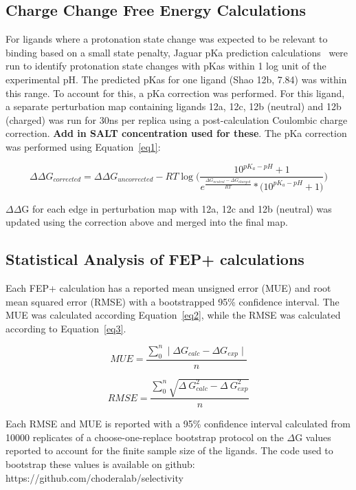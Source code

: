 \documentclass[phd,tocprelim]{cornell}
\begin{document}
\subsection{Charge Change Free Energy Calculations} 
For ligands where a protonation state change was expected to be relevant to binding based on a small state penalty, Jaguar pKa prediction calculations~\citep{Bochevarov2013-bn} were run to identify protonation state changes with pKas within 1 log unit of the experimental pH. The predicted pKas for one ligand (Shao 12b, 7.84) was within this range. To account for this, a pKa correction was performed. For this ligand, a separate perturbation map containing ligands 12a, 12c, 12b (neutral) and 12b (charged) was run for 30ns per replica using a post-calculation Coulombic charge correction. \textbf{Add in SALT concentration used for these}. The pKa correction was performed using Equation~\ref{eq1}: 

\begin{equation}\label{eq1}
\Delta\Delta G_{corrected} = \Delta\Delta G_{uncorrected} - RT\log\Bigg(\frac{10^{pK_a -pH}+1}{e^{\frac{\Delta G_{neutral} - \Delta G_{charged}}{RT}} * \big(10^{pK_a - pH}+1\big)}\Bigg)
\end{equation}

$\Delta\Delta$G for each edge in perturbation map with 12a, 12c and 12b (neutral) was updated using the correction above and merged into the final map. 

 
\subsection{Statistical Analysis of FEP+ calculations}
Each FEP+ calculation has a reported mean unsigned error (MUE) and root mean squared error (RMSE) with a bootstrapped 95\% confidence interval. The MUE was calculated according Equation~\ref{eq2}, while the RMSE was calculated according to Equation~\ref{eq3}. 

\begin{equation}\label{eq2}
MUE = \frac{ \sum_{0}^{n} \mid \Delta G _{calc} - \Delta G _{exp} \mid}{n}
 \end{equation}
 
 \begin{equation}\label{eq3}
RMSE = \frac{ \sum_{0}^{n} \sqrt{\Delta~G_{calc}^2 - \Delta~G_{exp}^2}}{n} 
 \end{equation}
 
 Each RMSE and MUE is reported with a 95\% confidence interval calculated from 10000 replicates of a choose-one-replace bootstrap protocol on the $\Delta$G values reported to account for the finite sample size of the ligands. The code used to bootstrap these values is available on github: https://github.com/choderalab/selectivity
 
\end{document}
